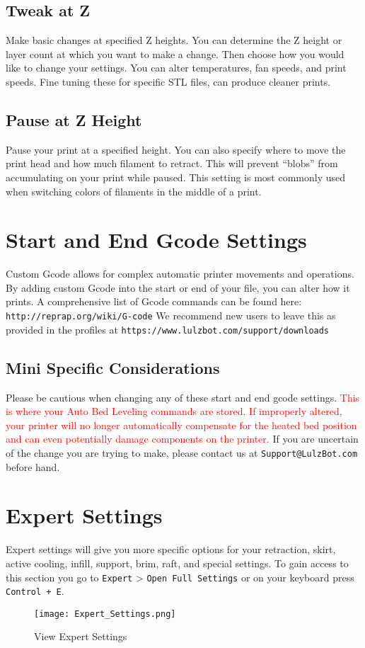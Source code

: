 \subsection{Tweak at Z}
Make basic changes at specified Z heights. You can determine the Z height or layer count at which you want to make a change. Then choose how you would like to change your settings. You can alter temperatures, fan speeds, and print speeds. Fine tuning these for specific STL files, can produce cleaner prints.

\subsection{Pause at Z Height}
Pause your print at a specified height. You can also specify where to move the print head and how much filament to retract. This will prevent “blobs” from accumulating on your print while paused. This setting is most commonly used when switching colors of filaments in the middle of a print.

\section{Start and End Gcode Settings}
Custom Gcode allows for complex automatic printer movements and operations. By adding custom Gcode into the start or end of your file, you can alter how it prints. A comprehensive list of Gcode commands can be found here: \texttt{http://reprap.org/wiki/G-code} We recommend new users to leave this as provided in the profiles at \texttt{https://www.lulzbot.com/support/downloads}

\subsection{Mini Specific Considerations}
Please be cautious when changing any of these start and end gcode settings. \textcolor{red}{This is where your Auto Bed Leveling commands are stored. If improperly altered, your printer will no longer automatically compensate for the heated bed position and can even potentially damage components on the printer.} If you are uncertain of the change you are trying to make, please contact us at \texttt{Support@LulzBot.com} before hand.

\section{Expert Settings}
Expert settings will give you more specific options for your retraction, skirt, active cooling, infill, support, brim, raft, and special settings. To gain access to this section you go to \texttt{Expert} > \texttt{Open Full Settings} or on your keyboard press \texttt{Control + E}.
\begin{figure}[H]
\centering
\texttt{[image: Expert\_Settings.png]}
\caption{View Expert Settings}
\label{fig:Expert Settings}
\end{figure}

